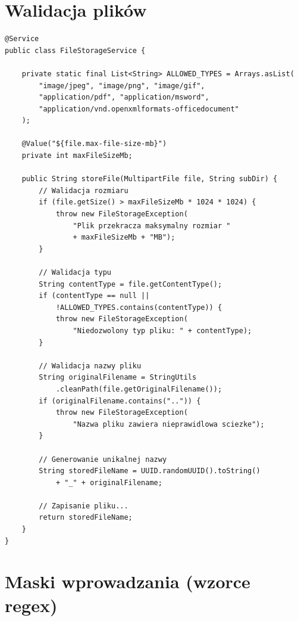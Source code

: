 \documentclass[12pt,a4paper]{report}
\begin{document}
\section{Walidacja plików}

\begin{lstlisting}[style=javastyle, caption={Walidacja uploadowanych plików}]
@Service
public class FileStorageService {

    private static final List<String> ALLOWED_TYPES = Arrays.asList(
        "image/jpeg", "image/png", "image/gif",
        "application/pdf", "application/msword",
        "application/vnd.openxmlformats-officedocument"
    );

    @Value("${file.max-file-size-mb}")
    private int maxFileSizeMb;

    public String storeFile(MultipartFile file, String subDir) {
        // Walidacja rozmiaru
        if (file.getSize() > maxFileSizeMb * 1024 * 1024) {
            throw new FileStorageException(
                "Plik przekracza maksymalny rozmiar " 
                + maxFileSizeMb + "MB");
        }

        // Walidacja typu
        String contentType = file.getContentType();
        if (contentType == null || 
            !ALLOWED_TYPES.contains(contentType)) {
            throw new FileStorageException(
                "Niedozwolony typ pliku: " + contentType);
        }

        // Walidacja nazwy pliku
        String originalFilename = StringUtils
            .cleanPath(file.getOriginalFilename());
        if (originalFilename.contains("..")) {
            throw new FileStorageException(
                "Nazwa pliku zawiera nieprawidlowa sciezke");
        }

        // Generowanie unikalnej nazwy
        String storedFileName = UUID.randomUUID().toString() 
            + "_" + originalFilename;
        
        // Zapisanie pliku...
        return storedFileName;
    }
}
\end{lstlisting}

\section{Maski wprowadzania (wzorce regex)}
\end{document}
